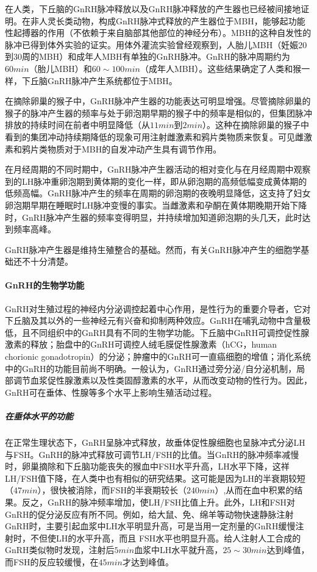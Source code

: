 在人类，下丘脑的GnRH脉冲释放以及GnRH脉冲释放的产生器也已经被间接地证明。在非人灵长类动物，构成GnRH脉冲式释放的产生器位于MBH，能够起功能性起搏器的作用（不依赖于来自脑部其他部位的神经分布）。MBH的这种自发性的脉冲已得到体外实验的证实。用体外灌流实验曾经观察到，人胎儿MBH（妊娠20到30周的MBH）和成年人MBH有单独的GnRH脉冲。GnRH的脉冲周期约为$ 60min $（胎儿MBH）和$ 60\sim 100min $（成年人MBH）。这些结果确定了人类和猴一样，下丘脑GnRH脉冲产生系统都位于MBH。

在摘除卵巢的猴子中，GnRH脉冲产生器的功能表达可明显增强。尽管摘除卵巢的猴子的脉冲产生器的频率与处于卵泡期早期的猴子中的频率是相似的，但集团脉冲排放的持续时间在前者中明显降低（从$ 11min $到$ 2min $）。这种在摘除卵巢的猴子中看到的集团冲动持续期降低的现象可用注射雌激素和鸦片类物质来恢复。可见雌激素和鸦片类物质对于MBH的自发冲动产生具有调节作用。

在月经周期的不同时期中，GnRH脉冲产生器活动的相对变化与在月经周期中观察到的LH脉冲重卵泡期到黄体期的变化一样，即从卵泡期的高频低幅变成黄体期的低频高幅。GnRH脉冲产生的频率在周期的卵泡期的夜晚明显降低，这支持了妇女卵泡期早期在睡眠时LH脉冲变慢的事实。当雌激素和孕酮在黄体期晚期开始下降时，GnRH脉冲产生器的频率变得明显，并持续增加知道卵泡期的头几天，此时达到频率高峰。

GnRH脉冲产生器是维持生殖整合的基础。然而，有关GnRH脉冲产生的细胞学基础还不十分清楚。

\paragraph{GnRH的生物学功能}

GnRH对生殖过程的神经内分泌调控起着中心作用，是性行为的重要介导者，它对下丘脑及其以外的一些神经元有兴奋和抑制两种效应。GnRH在哺乳动物中含量极低，且不同组织中的GnRH具有不同的生物学功能。下丘脑中GnRH可调控促性腺激素的释放；胎盘中的GnRH可调控人绒毛膜促性腺激素（hCG，human chorionic gonadotropin）的分泌；肿瘤中的GnRH可一直癌细胞的增值；消化系统中的GnRH的功能目前尚不明确。一般认为，GnRH通过旁分泌/自分泌机制，局部调节血浆促性腺激素以及性类固醇激素的水平，从而改变动物的性行为。因此，GnRH可在垂体、性腺等多个水平上影响生殖活动过程。

\subparagraph{在垂体水平的功能}

在正常生理状态下，GnRH呈脉冲式释放，故垂体促性腺细胞也呈脉冲式分泌LH与FSH。GnRH的脉冲式释放可调节LH/FSH的比值。当GnRH的脉冲频率减慢时，卵巢摘除和下丘脑功能丧失的猴血中FSH水平升高，LH水平下降，这祥LH/FSH值下降，在人类中也有相似的研究结果。这可能是因为LH的半衰期较短（$ 47min $），很快被消除，而FSH的半衰期较长（$ 240min $）,从而在血中积累的结果。反之，GnRH的脉冲频率增加，使LH/FSH比值上升。此外，LH和FSH对GnRH的促分泌反应有所不同。例如，给大鼠、免、绵羊等动物快速静脉注射GnRH时，主要引起血浆中LH水平明显升高，可是当用一定剂量的GnRH缓慢注射时，不但使LH的水平升高，而且
FSH水平也明显升高。给人注射人工合成的GnRH类似物时发现，注射后$ 5min $血浆中LH水平就升高，$ 25\sim 30 min $达到峰值，而FSH的反应较缓慢，在$ 45min $才达到峰值。

